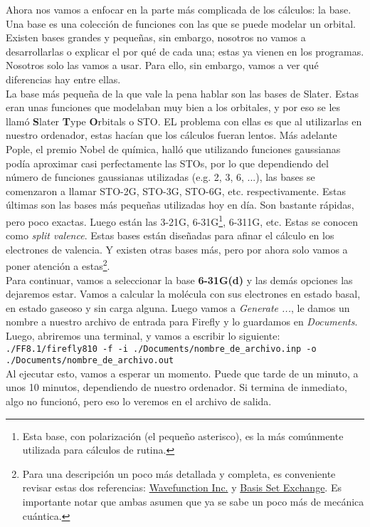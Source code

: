 \documentclass[10pt,letterpaper]{article}
\newcommand{\inlinecode}[1]{
\colorbox{light-gray}{\texttt{#1}}
}
\begin{document}
Ahora nos vamos a enfocar en la parte m\'as complicada de los c\'alculos: la base. Una base es una colecci\'on de funciones con las que se puede modelar un orbital. Existen bases grandes y peque\~nas, sin embargo, nosotros no vamos a desarrollarlas o explicar el por qu\'e de cada una; estas ya vienen en los programas. Nosotros solo las vamos a usar. Para ello, sin embargo, vamos a ver qu\'e diferencias hay entre ellas.\\

La base m\'as peque\~na de la que vale la pena hablar son las bases de Slater. Estas eran unas funciones que modelaban muy bien a los orbitales, y por eso se les llam\'o \textbf{S}later \textbf{T}ype \textbf{O}rbitals o STO. EL problema con ellas es que al utilizarlas en nuestro ordenador, estas hac\'ian que los c\'alculos fueran lentos. M\'as adelante Pople, el premio Nobel de qu\'imica, hall\'o que utilizando funciones gaussianas pod\'ia aproximar casi perfectamente las STOs, por lo que dependiendo del n\'umero de funciones gaussianas utilizadas (e.g. 2, 3, 6, ...), las bases se comenzaron a llamar STO-2G, STO-3G, STO-6G, etc. respectivamente. Estas \'ultimas son las bases m\'as peque\~nas utilizadas hoy en d\'ia. Son bastante r\'apidas, pero poco exactas. Luego est\'an las 3-21G, 6-31G\footnote{Esta base, con polarizaci\'on (el peque\~no asterisco), es la m\'as com\'unmente utilizada para c\'alculos de rutina.}, 6-311G, etc. Estas se conocen como \emph{split valence}. Estas bases est\'an dise\~nadas para afinar el c\'alculo en los electrones de valencia. Y existen otras bases m\'as, pero por ahora solo vamos a poner atenci\'on a estas\footnote{Para una descripci\'on un poco m\'as detallada y completa, es conveniente revisar estas dos referencias: \href{https://www.wavefun.com/support/sp_compfaq/Basis_Set_FAQ.html}{Wavefunction Inc.} y \href{https://bse.pnl.gov/bse/portal}{Basis Set Exchange}. Es importante notar que ambas asumen que ya se sabe un poco m\'as de mec\'anica cu\'antica.}.\\

Para continuar, vamos a seleccionar la base \textbf{6-31G(d)} y las dem\'as opciones las dejaremos estar. Vamos a calcular la mol\'ecula con sus electrones en estado basal, en estado gaseoso y sin carga alguna. Luego vamos a \textit{Generate ...}, le damos un nombre a nuestro archivo de entrada para Firefly y lo guardamos en \textit{Documents}. Luego, abriremos una terminal, y vamos a escribir lo siguiente:\\
\inlinecode{./FF8.1/firefly810 -f -i ./Documents/nombre\_de\_archivo.inp -o ./Documents/nombre\_de\_archivo.out}\\
Al ejecutar esto, vamos a esperar un momento. Puede que tarde de un minuto, a unos 10 minutos, dependiendo de nuestro ordenador. Si termina de inmediato, algo no funcion\'o, pero eso lo veremos en el archivo de salida.\\
\end{document}

